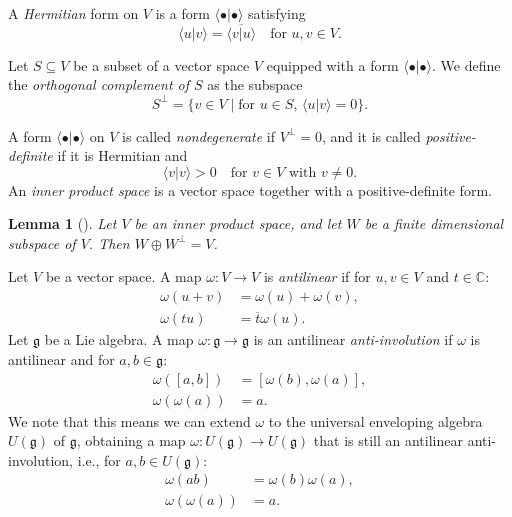\documentclass[a4paper, 12pt, reqno]{amsart}
\newtheorem{lemma}[theorem]{Lemma}
\theoremstyle{remark}
\begin{document}
A \emph{Hermitian} form on $V$ is a form $\langle\bullet| \bullet\rangle$ satisfying
\begin{equation*}
  \langle u| v\rangle = \overline{\langle v| u\rangle} \quad \text{for $u, v \in V$}.
\end{equation*}

Let $S \subseteq V$ be a subset of a vector space $V$ equipped with a form $\langle\bullet| \bullet\rangle$.
We define the \emph{orthogonal complement of $S$} as the subspace
\begin{equation*}
  S^{\perp} = \{v \in V \mid \text{for $u \in S$, $\langle u| v\rangle = 0$}\}.
\end{equation*}

A form $\langle\bullet| \bullet\rangle$ on $V$ is called \emph{nondegenerate} if $V^{\perp} = 0$, and it is called \emph{positive-definite} if it is Hermitian and
\begin{equation*}
  \langle v| v\rangle > 0 \quad \text{for $v \in V$ with $v \neq 0$}.
\end{equation*}
An \emph{inner product space} is a vector space together with a positive-definite form.

\begin{lemma}[{\cite[\S8.2 Theorem 5]{hoffman_linear_1971}}]
  \label{lmm:17}
  Let $V$ be an inner product space, and let $W$ be a finite dimensional subspace of $V$.
  Then $W \oplus W^{\perp} = V$.
\end{lemma}

Let $V$ be a  vector space.
A map $\omega: V \to V$ is \emph{antilinear} if for $u, v \in V$ and $t \in \mathbb{C}$:
\begin{align*}
  \omega(u + v) &= \omega(u) + \omega(v), \\
  \omega(tu) &= \overline{t}\omega(u).
\end{align*}
Let $\mathfrak{g}$ be a Lie algebra.
A map $\omega: \mathfrak{g} \to \mathfrak{g}$ is an antilinear \emph{anti-involution} if $\omega$ is antilinear and for $a, b \in \mathfrak{g}$:
\begin{align*}
  \omega([a, b]) &= [\omega(b), \omega(a)], \\
  \omega(\omega(a)) &= a.
\end{align*}
We note that this means we can extend $\omega$ to the universal enveloping algebra $U(\mathfrak{g})$ of $\mathfrak{g}$, obtaining a map $\omega: U(\mathfrak{g}) \to U(\mathfrak{g})$ that is still an antilinear anti-involution, i.e., for $a, b \in U(\mathfrak{g})$:
\begin{align*}
  \omega(ab) &= \omega(b)\omega(a), \\
  \omega(\omega(a)) &= a.
\end{align*}
\end{document}

